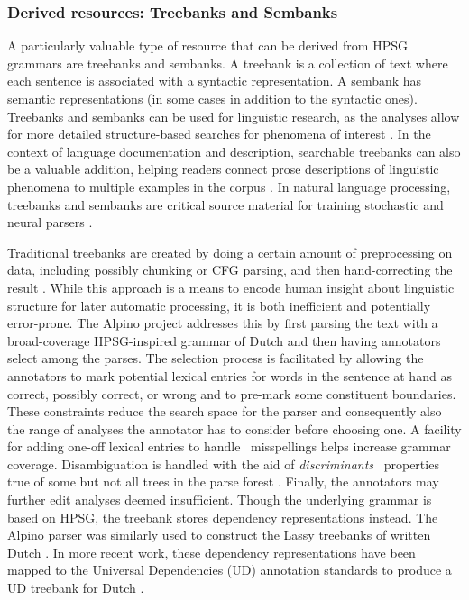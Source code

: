 \documentclass[output=paper,nonflat]{langsci/langscibook}
\begin{document}
\subsubsection{Derived resources: Treebanks and Sembanks}
\label{cl:treebanks}

A particularly valuable type of resource that can be derived from HPSG
grammars are treebanks and sembanks. A treebank is a collection of
text where each sentence is associated with a syntactic
representation. A sembank has semantic representations (in some cases
in addition to the syntactic ones). Treebanks and sembanks can be used
for linguistic research, as the analyses allow for more detailed
structure-based searches for phenomena of interest \citep{Rohde:05,Gho:Bir:10,Kou:Oep:14}. In the context of language documentation and description, searchable
treebanks can also be a valuable addition, helping readers connect
prose descriptions of linguistic phenomena to multiple examples in the
corpus \citep{Ben:Gho:Bal:Dri:12}. In natural language processing,
treebanks and sembanks are critical source material for training
stochastic and neural parsers \citep{FIXME}.

Traditional treebanks are created by doing a certain amount of
preprocessing on data, including possibly chunking or CFG parsing, and
then hand-correcting the result \citep{Mar:San:Mar:93,Ban:Bon:Cai:13}.
While this approach is a means to encode human insight about
linguistic structure for later automatic processing, it is both
inefficient and potentially error-prone. The Alpino project
\citep{vanderbeek2002alpino} addresses this by first parsing the text
with a broad-coverage HPSG-inspired grammar of Dutch and then having
annotators select among the parses. The selection process is
facilitated by allowing the annotators to mark potential lexical
entries for words in the sentence at hand as correct, possibly
correct, or wrong and to pre-mark some constituent boundaries. These
constraints reduce the search space for the parser and consequently
also the range of analyses the annotator has to consider before
choosing one. A facility for adding one-off lexical entries to handle
\eg\ misspellings helps increase grammar coverage.  Disambiguation is
handled with the aid of \emph{discriminants} \ie\ properties true of
some but not all trees in the parse forest \citep{Carter:97}. Finally,
the annotators may further edit analyses deemed insufficient. Though
the underlying grammar is based on HPSG, the treebank stores
dependency representations instead.  The Alpino parser was similarly
used to construct the Lassy treebanks of written Dutch
\citep{van:bou:van:13}.  In more recent work, these dependency
representations have been mapped to the Universal Dependencies (UD)
annotation standards \citep{Niv:Mar:Gin:16} to produce a UD treebank
for Dutch \citep{Bou:Van:17}.
\end{document}
